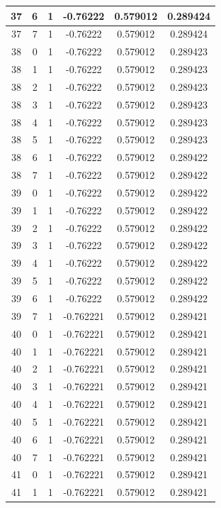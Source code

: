 \documentclass[12pt,a4paper]{article}
\numberwithin{equation}{section}
\numberwithin{figure}{section}
\numberwithin{table}{section}
\begin{document}
\begin{longtable}{|c|c|c|c|c|c|}
37 & 6 & 1 & -0.76222 & 0.579012 & 0.289424 \\ \hline
37 & 7 & 1 & -0.76222 & 0.579012 & 0.289424 \\ \hline
38 & 0 & 1 & -0.76222 & 0.579012 & 0.289423 \\ \hline
38 & 1 & 1 & -0.76222 & 0.579012 & 0.289423 \\ \hline
38 & 2 & 1 & -0.76222 & 0.579012 & 0.289423 \\ \hline
38 & 3 & 1 & -0.76222 & 0.579012 & 0.289423 \\ \hline
38 & 4 & 1 & -0.76222 & 0.579012 & 0.289423 \\ \hline
38 & 5 & 1 & -0.76222 & 0.579012 & 0.289423 \\ \hline
38 & 6 & 1 & -0.76222 & 0.579012 & 0.289422 \\ \hline
38 & 7 & 1 & -0.76222 & 0.579012 & 0.289422 \\ \hline
39 & 0 & 1 & -0.76222 & 0.579012 & 0.289422 \\ \hline
39 & 1 & 1 & -0.76222 & 0.579012 & 0.289422 \\ \hline
39 & 2 & 1 & -0.76222 & 0.579012 & 0.289422 \\ \hline
39 & 3 & 1 & -0.76222 & 0.579012 & 0.289422 \\ \hline
39 & 4 & 1 & -0.76222 & 0.579012 & 0.289422 \\ \hline
39 & 5 & 1 & -0.76222 & 0.579012 & 0.289422 \\ \hline
39 & 6 & 1 & -0.76222 & 0.579012 & 0.289422 \\ \hline
39 & 7 & 1 & -0.762221 & 0.579012 & 0.289421 \\ \hline
40 & 0 & 1 & -0.762221 & 0.579012 & 0.289421 \\ \hline
40 & 1 & 1 & -0.762221 & 0.579012 & 0.289421 \\ \hline
40 & 2 & 1 & -0.762221 & 0.579012 & 0.289421 \\ \hline
40 & 3 & 1 & -0.762221 & 0.579012 & 0.289421 \\ \hline
40 & 4 & 1 & -0.762221 & 0.579012 & 0.289421 \\ \hline
40 & 5 & 1 & -0.762221 & 0.579012 & 0.289421 \\ \hline
40 & 6 & 1 & -0.762221 & 0.579012 & 0.289421 \\ \hline
40 & 7 & 1 & -0.762221 & 0.579012 & 0.289421 \\ \hline
41 & 0 & 1 & -0.762221 & 0.579012 & 0.289421 \\ \hline
41 & 1 & 1 & -0.762221 & 0.579012 & 0.289421 \\ \hline

\end{longtable}
\end{document}
